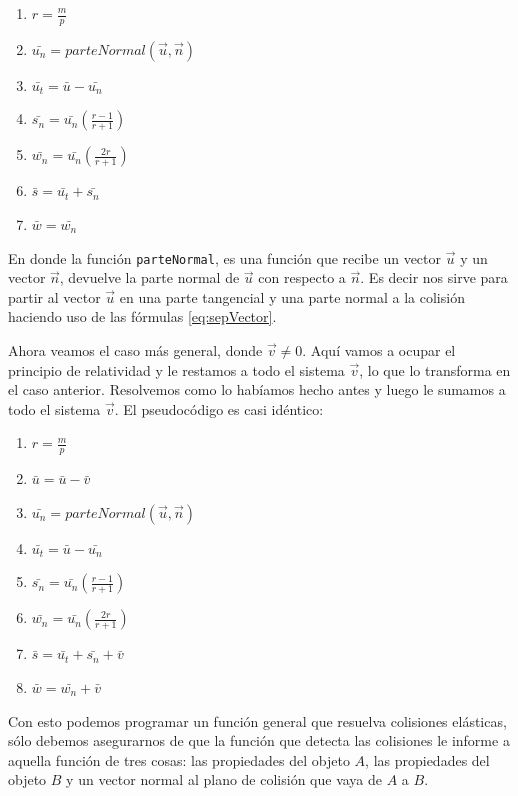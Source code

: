 \begin{enumerate}
 \item $r = \frac{m}{p}$
 \item $\bar{u_n} = parteNormal(\vec{u}, \vec{n})$
 \item $\bar{u_t} = \bar{u} - \bar{u_n}$
 \item $\bar{s_n} = \bar{u_n} \left( \frac{r - 1}{r + 1} \right) $
 \item $\bar{w_n} = \bar{u_n} \left( \frac{2r}{r + 1} \right) $
 \item $\bar{s} = \bar{u_t} + \bar{s_n}$
 \item $\bar{w} = \bar{w_n}$
\end{enumerate}
En donde la función \verb|parteNormal|, es una función que recibe un vector $\vec{u}$ y un vector $\vec{n}$, devuelve la parte normal de $\vec{u}$ con respecto a $\vec{n}$. Es decir nos sirve para partir al vector $\vec{u}$ en una parte tangencial y una parte normal a la colisión haciendo uso de las fórmulas \ref{eq:sepVector}.

Ahora veamos el caso más general, donde $\vec{v} \neq 0$. Aquí vamos a ocupar el principio de relatividad y le restamos a todo el sistema $\vec{v}$, lo que lo transforma en el caso anterior. Resolvemos como lo habíamos hecho antes y luego le sumamos a todo el sistema $\vec{v}$. El pseudocódigo es casi idéntico:
 
\begin{enumerate}
\label{respuestaColision} 
 \item $r = \frac{m}{p}$
 \item $\bar{u} = \bar{u} - \bar{v}$
 \item $\bar{u_n} = parteNormal(\vec{u}, \vec{n})$
 \item $\bar{u_t} = \bar{u} - \bar{u_n}$
 \item $\bar{s_n} = \bar{u_n} \left( \frac{r - 1}{r + 1} \right) $
 \item $\bar{w_n} = \bar{u_n} \left( \frac{2r}{r + 1} \right) $
 \item $\bar{s} = \bar{u_t} + \bar{s_n} + \bar{v}$
 \item $\bar{w} = \bar{w_n} + \bar{v}$
\end{enumerate}

Con esto podemos programar un función general que resuelva colisiones elásticas, sólo debemos asegurarnos de que la función que detecta las colisiones le informe a aquella función de tres cosas: las propiedades del objeto $A$, las propiedades del objeto $B$ y un vector normal al plano de colisión que vaya de $A$ a $B$.

